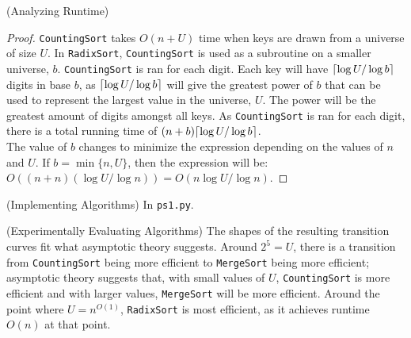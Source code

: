 \documentclass[11pt]{scrartcl}
\theoremstyle{dotlessP}
\theoremstyle{dotlessN}
\DeclarePairedDelimiter\ceil{\lceil}{\rceil} %
\begin{document}
\begin{ans} (Analyzing Runtime) \
	\begin{proof}
		\texttt{CountingSort} takes $O(n + U)$ time when keys are drawn from a universe of size $U$. In \texttt{RadixSort}, \texttt{CountingSort} is used as a subroutine on a smaller universe, $b$. \texttt{CountingSort} is ran for each digit. Each key will have $\ceil*{\log U/\log b}$ digits in base $b$, as $\ceil*{\log U/\log b}$ will give the greatest power of $b$ that can be used to represent the largest value in the universe, $U$. The power will be the greatest amount of digits amongst all keys. As \texttt{CountingSort} is ran for each digit, there is a total running time of $(n+b)\ceil*{\log U/\log b}$. 
		\\

		The value of $b$ changes to minimize the expression depending on the values of $n$ and $U$. If $b = \min\{n,U\}$, then the expression will be: $O((n + n) (\log U / \log n)) = O(n\log U / \log n)$.
	\end{proof}
\end{ans}
\begin{ans} (Implementing Algorithms) In \texttt{ps1.py}.
\end{ans}
\begin{ans} (Experimentally Evaluating Algorithms) 
	The shapes of the resulting transition curves fit what asymptotic theory suggests. Around $2^5 = U$, there is a transition from \texttt{CountingSort} being more efficient to \texttt{MergeSort} being more efficient; asymptotic theory suggests that, with small values of $U$, \texttt{CountingSort} is more efficient and with larger values, \texttt{MergeSort} will be more efficient. Around the point where $U = n^{O(1)}$, \texttt{RadixSort} is most efficient, as it achieves runtime  $O(n)$ at that point.
\end{ans}
\end{document}
